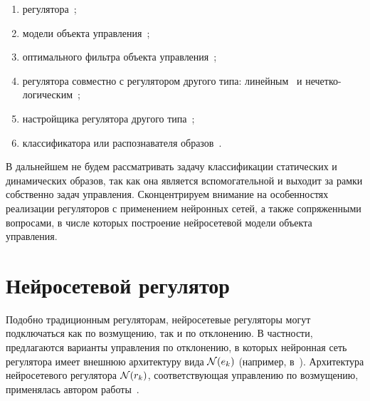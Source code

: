 \begin{enumerate}

\item
регулятора~\cite{sigom00,khomyu96,kav96,bouchard01,linwaihong01,gorfeld96,tukin01,pican95,golovko01,fabri98};

\item
модели объекта управления~\cite{narmuk96,park96,levinar95,kulee96};

\item
оптимального фильтра объекта управления~\cite{hayyeeder97};

\item
регулятора совместно с регулятором другого типа:
линейным~\cite{steck96,sigom00,chenmills97} и
нечетко-логическим~\cite{sigom00,wailinlin00,linwaihong01};

\item
настройщика регулятора другого типа~\cite{sigom00,samtar96};

\item
классификатора или распознавателя
образов~\cite{uhrig91,zhuchkov02,basubart94,golovko01}.

\end{enumerate}

В дальнейшем не будем рассматривать задачу классификации статических и
динамических образов, так как она является вспомогательной и выходит
за рамки собственно задач управления.  Сконцентрируем внимание на
особенностях реализации регуляторов с применением нейронных сетей, а
также сопряженными вопросами, в числе которых построение нейросетевой
модели объекта управления.

\section{Нейросетевой регулятор}


Подобно традиционным регуляторам, нейросетевые регуляторы могут
подключаться как по возмущению, так и по отклонению.  В частности,
предлагаются варианты управления по отклонению, в которых нейронная
сеть регулятора имеет внешнюю архитектуру вида $\mathcal{N}(e_k)$ (например,
в~\cite{ronco98}).
Архитектура нейросетевого регулятора $\mathcal{N}(r_k)$, соответствующая
управлению по возмущению, применялась автором работы~\cite{khomyu96}.


